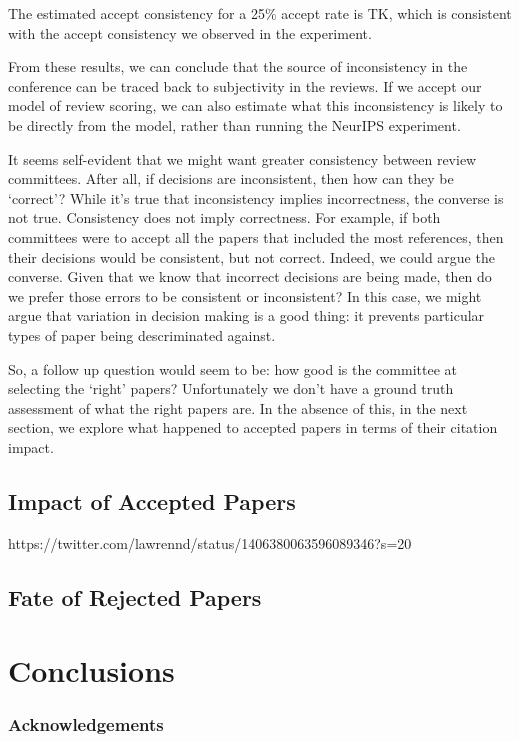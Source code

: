\documentclass[twoside]{article}
\begin{document}
The estimated accept consistency for a 25\% accept rate is TK, which is consistent with the accept consistency we observed in the experiment.

From these results, we can conclude that the source of inconsistency in the conference can be traced back to subjectivity in the reviews. If we accept our model of review scoring, we can also estimate what this inconsistency is likely to be directly from the model, rather than running the NeurIPS experiment.

It seems self-evident that we might want greater consistency between review committees. After all, if decisions are inconsistent, then how can they be `correct'? While it's true that inconsistency implies incorrectness, the converse is not true. Consistency does not imply correctness. For example, if both committees were to accept all the papers that included the most references, then their decisions would be consistent, but not correct. Indeed, we could argue the converse. Given that we know that incorrect decisions are being made, then do we prefer those errors to be consistent or inconsistent? In this case, we might argue that variation in decision making is a good thing: it prevents particular types of paper being descriminated against.

So, a follow up question would seem to be: how good is the committee at selecting the `right' papers? Unfortunately we don't have a ground truth assessment of what the right papers are. In the absence of this, in the next section, we explore what happened to accepted papers in terms of their citation impact. 

\subsection{Impact of Accepted Papers}

https://twitter.com/lawrennd/status/1406380063596089346?s=20

\subsection{Fate of Rejected Papers}

\section{Conclusions}

\subsubsection*{Acknowledgements}




\onecolumn
{}
\appendix


\vfill
\end{document}
